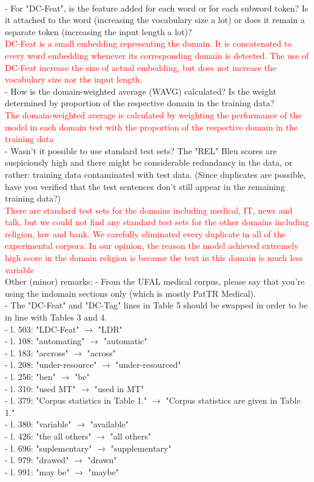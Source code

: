 \documentclass[12pt,times,a4paper,twoside]{article}
\theoremstyle{definition}
\begin{document}
\\
- For "DC-Feat", is the feature added for each word or for each subword token? Is it attached to the word (increasing the vocabulary size a lot) or does it remain a separate token (increasing the input length a lot)?
\\
\textcolor{red}{DC-Feat is a small embedding representing the domain. It is concatenated to every word embedding whenever its corresponding domain is detected. The use of DC-Feat increase the size of actual embedding, but does not increase the vocabulary size nor the input length.}
\\
- How is the domain-weighted average (WAVG) calculated? Is the weight determined by proportion of the respective domain in the training data?
\\
\textcolor{red}{The domain-weighted average is calculated by weighting the performance of the model in each domain test with the proportion of the respective domain in the training data}
\\
- Wasn't it possible to use standard test sets? The "REL" Bleu scores are suspiciously high and there might be considerable redundancy in the data, or rather: training data contaminated with test data. (Since duplicates are possible, have you verified that the test sentences don't still appear in the remaining training data?)
\\
\textcolor{red}{There are standard test sets for the domains including medical, IT, news and talk, but we could not find any standard test sets for the other domains including religion, law and bank. We carefully eliminated every duplicate in all of the experimental corpora. In our opinion, the reason the model achieved extremely high score in the domain religion is because the text in this domain is much less variable}
\\
Other (minor) remarks:
- From the UFAL medical corpus, please say that you're using the indomain sections only (which is mostly PatTR Medical).
\\
- The "DC-Feat" and "DC-Tag" lines in Table 5 should be swapped in order to be in line with Tables 3 and 4.
\\
- l. 503: "LDC-Feat" $\rightarrow$ "LDR"
\\
- l. 108: "automating" $\rightarrow$ "automatic"
\\
- l. 183: "accross" $\rightarrow$ "across"
\\
- l. 208: "under-resource" $\rightarrow$ "under-resourced"
\\
- l. 256: "ben" $\rightarrow$ "be"
\\
- l. 310: "used MT" $\rightarrow$ "used in MT"
\\
- l. 379: "Corpus statistics in Table 1." $\rightarrow$ "Corpus statistics are given in
Table 1."
\\
- l. 380: "variable" $\rightarrow$ "available"
\\
- l. 426: "the all others" $\rightarrow$ "all others"
\\
- l. 696: "suplementary" $\rightarrow$ "supplementary"
\\
- l. 979: "drawed" $\rightarrow$ "drawn"
\\
- l. 991: "may be" $\rightarrow$ "maybe"



\end{document}
